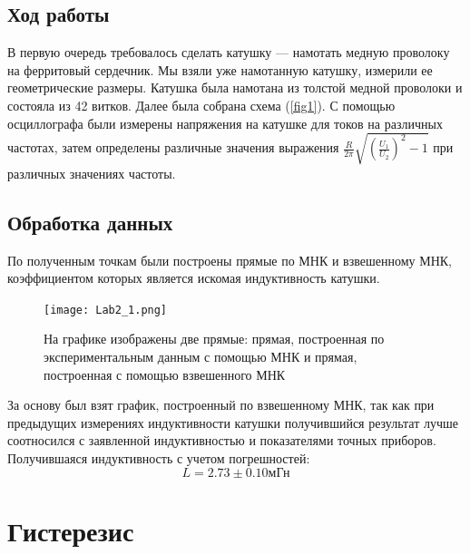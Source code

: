 \documentclass[a4paper,14pt]{extarticle}
\begin{document}
		\subsection{Ход работы}
			В первую очередь требовалось сделать катушку — намотать медную проволоку на
			ферритовый сердечник. Мы взяли уже намотанную катушку, измерили ее геометрические размеры. Катушка была намотана из толстой медной проволоки и состояла из 42 витков.
			Далее была собрана схема (\ref{fig1}). С помощью осциллографа были измерены напряжения на катушке для токов на различных частотах, затем определены различные значения выражения $\frac{R}{2\pi}\sqrt{(\frac{U_1}{U_2})^2 - 1}$ при различных значениях частоты.
		\subsection{Обработка данных}
			По полученным точкам были построены прямые по МНК и взвешенному МНК, коэффициентом которых является искомая индуктивность катушки.
			\begin{figure}[h]
				\centering
				\texttt{[image: Lab2\_1.png]}
				\caption{На графике изображены две прямые: прямая, построенная по экспериментальным данным с помощью МНК и прямая, построенная с помощью взвешенного МНК}
				\label{fig2}
			\end{figure} 
			\newpage
			За основу был взят график, построенный по взвешенному МНК, так как при предыдущих измерениях индуктивности катушки получившийся результат лучше соотносился с заявленной индуктивностью и показателями точных приборов. Получившаяся индуктивность с учетом погрешностей:
			\begin{equation}
				L = 2.73 \pm 0.10\text{мГн}
			\end{equation}
	\section{Гистерезис}
\end{document}
